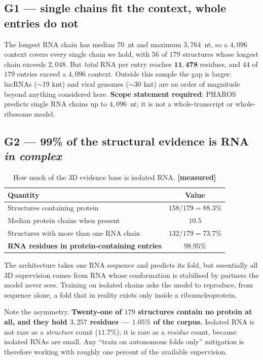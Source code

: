 \documentclass[11pt,a4paper]{article}
\newcommand{\meas}{\textcolor{measured}{\textbf{[measured]}}}
\begin{document}
\subsection{G1 --- single chains fit the context, whole entries do not}

The longest RNA chain has median $70$~nt and maximum $3{,}764$~nt, so a
$4{,}096$ context covers every single chain we hold, with $56$ of $179$
structures whose longest chain exceeds $2{,}048$. But \emph{total} RNA per entry
reaches $\mathbf{11{,}478}$ residues, and $44$ of $179$ entries exceed a
$4{,}096$ context. Outside this sample the gap is larger: lncRNAs ($\sim$19 knt)
and viral genomes ($\sim$30 knt) are an order of magnitude beyond anything
considered here.
\textbf{Scope statement required}: PHAROS predicts single RNA chains up to
$4{,}096$~nt; it is not a whole-transcript or whole-ribosome model.

\subsection{G2 --- 99\% of the structural evidence is RNA \emph{in complex}}

\begin{table}[h]
\centering
\caption{How much of the 3D evidence base is isolated RNA. \meas}
\begin{tabular}{lc}
\toprule
\textbf{Quantity} & \textbf{Value} \\
\midrule
Structures containing protein & $158/179 = \mathbf{88.3\%}$ \\
Median protein chains when present & $\mathbf{10.5}$ \\
Structures with more than one RNA chain & $132/179 = 73.7\%$ \\
\textbf{RNA residues in protein-containing entries} & $\mathbf{98.95\%}$ \\
\bottomrule
\end{tabular}
\end{table}

The architecture takes one RNA sequence and predicts its fold, but essentially
all 3D supervision comes from RNA whose conformation is stabilised by partners
the model never sees. Training on isolated chains asks the model to reproduce,
from sequence alone, a fold that in reality exists only inside a
ribonucleoprotein.

Note the asymmetry. \textbf{Twenty-one of $179$ structures contain no protein at
all, and they hold $3{,}257$ residues --- $1.05\%$ of the corpus.} Isolated RNA
is not rare as a \emph{structure} count ($11.7\%$); it is rare as a
\emph{residue} count, because isolated RNAs are small. Any ``train on autonomous
folds only'' mitigation is therefore working with roughly one percent of the
available supervision.
\end{document}
